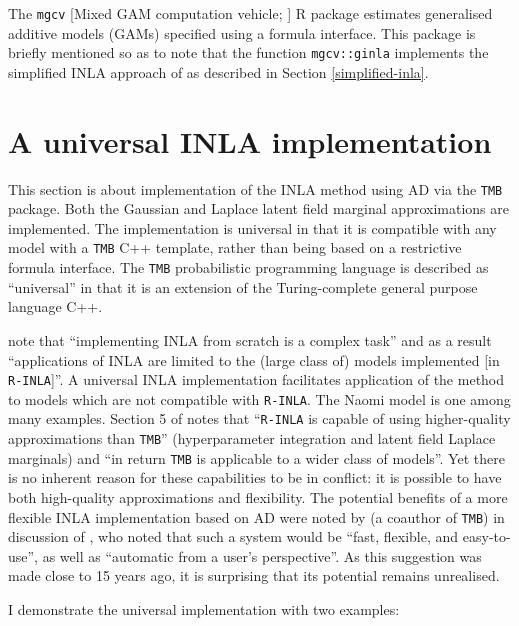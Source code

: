 \documentclass[a4paper, nobind]{templates/ociamthesis}
\begin{document}
The \texttt{mgcv} {[}Mixed GAM computation vehicle; \textcite{wood2017generalized}{]} R package estimates generalised additive models (GAMs) specified using a formula interface.
This package is briefly mentioned so as to note that the function \texttt{mgcv::ginla} implements the simplified INLA approach of \textcite{wood2020simplified} as described in Section \ref{simplified-inla}.

\hypertarget{universal}{%
\section{A universal INLA implementation}\label{universal}}

This section is about implementation of the INLA method using AD via the \texttt{TMB} package.
Both the Gaussian and Laplace latent field marginal approximations are implemented.
The implementation is universal in that it is compatible with any model with a \texttt{TMB} C++ template, rather than being based on a restrictive formula interface.
The \texttt{TMB} probabilistic programming language is described as ``universal'' in that it is an extension of the Turing-complete general purpose language C++.

\textcite{martino2019integrated} note that ``implementing INLA from scratch is a complex task'' and as a result ``applications of INLA are limited to the (large class of) models implemented {[}in \texttt{R-INLA}{]}''.
A universal INLA implementation facilitates application of the method to models which are not compatible with \texttt{R-INLA}.
The Naomi model is one among many examples.
Section 5 of \textcite{osgood2023statistical} notes that ``\texttt{R-INLA} is capable of using higher-quality approximations than \texttt{TMB}'' (hyperparameter integration and latent field Laplace marginals) and ``in return \texttt{TMB} is applicable to a wider class of models''.
Yet there is no inherent reason for these capabilities to be in conflict: it is possible to have both high-quality approximations and flexibility.
The potential benefits of a more flexible INLA implementation based on AD were noted by \textcite{skaug2009approximate} (a coauthor of \texttt{TMB}) in discussion of \textcite{rue2009approximate}, who noted that such a system would be ``fast, flexible, and easy-to-use'', as well as ``automatic from a user's perspective''.
As this suggestion was made close to 15 years ago, it is surprising that its potential remains unrealised.

I demonstrate the universal implementation with two examples:
\end{document}
